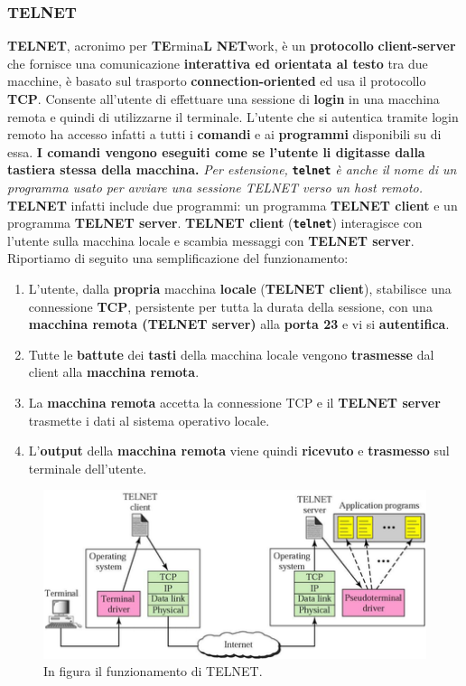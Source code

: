 \documentclass[11pt,a4paper]{article}
\theoremstyle{definition}
\begin{document}
\subsubsection{TELNET}
\textbf{TELNET}, acronimo per \textbf{TE}rmina\textbf{L} \textbf{NET}work, è un \textbf{protocollo} \textbf{client-server} che fornisce una comunicazione \textbf{interattiva ed orientata al testo} tra due macchine, è basato sul trasporto \textbf{connection-oriented} ed usa il protocollo \textbf{TCP}.
Consente all'utente di effettuare una sessione di \textbf{login} in una macchina remota e quindi di utilizzarne il terminale. L'utente che si autentica tramite login remoto ha accesso infatti a tutti i \textbf{comandi} e ai \textbf{programmi} disponibili su di essa. \textbf{I comandi vengono eseguiti come se l'utente li digitasse dalla tastiera stessa della macchina.} \textit{Per estensione,} \texttt{\textbf{telnet}} \textit{è anche il nome di un programma usato per avviare una sessione TELNET verso un host remoto.}
\textbf{TELNET} infatti include due programmi: un programma \textbf{TELNET client} e un programma \textbf{TELNET server}. \textbf{TELNET client} (\texttt{\textbf{telnet}}) interagisce con l'utente sulla macchina locale e scambia messaggi con \textbf{TELNET server}. Riportiamo di seguito una semplificazione del funzionamento:
\begin{enumerate}
	\item L'utente, dalla \textbf{propria} macchina \textbf{locale} (\textbf{\textbf{TELNET client}}), stabilisce una connessione \textbf{TCP}, persistente per tutta la durata della sessione, con una \textbf{macchina remota (\textbf{TELNET server})} alla \textbf{porta 23} e vi si \textbf{autentifica}.
	\item  Tutte le \textbf{battute} dei \textbf{tasti} della macchina locale vengono \textbf{trasmesse} dal client
	      alla \textbf{macchina remota}.
	\item La \textbf{macchina remota} accetta la connessione TCP e il \textbf{TELNET server} trasmette i dati al sistema operativo locale.
	\item L'\textbf{output} della \textbf{macchina remota} viene quindi \textbf{ricevuto} e \textbf{trasmesso} sul terminale dell'utente.
\end{enumerate}
\begin{figure}[!h]
	\includegraphics[scale=0.8]{Immagini/TELNET.png}
	\centering
	\caption{In figura il funzionamento di TELNET.}
\end{figure}
\end{document}
